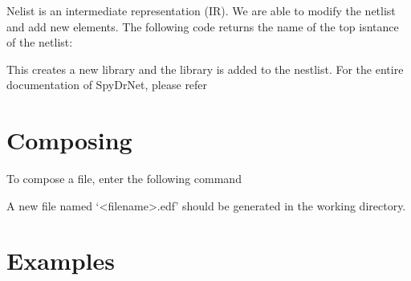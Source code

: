 \documentclass[letterpaper,10pt,english,openany,oneside]{sphinxmanual}
\begin{document}
Nelist is an intermediate representation (IR). We are able to modify the netlist and add new elements. The following code returns the name of the top isntance of the netlist:

\begin{sphinxVerbatim}[commandchars=\\\{\}]
\end{sphinxVerbatim}

This creates a new library and the library is added to the nestlist. For the entire documentation of SpyDrNet, please refer {\hyperref[\detokenize{reference/classes/index:api-summary}]{}}

\begin{sphinxVerbatim}[commandchars=\\\{\}]
\end{sphinxVerbatim}


\section{Composing}
\label{\detokenize{tutorial:composing}}
To compose a file, enter the following command

\begin{sphinxVerbatim}[commandchars=\\\{\}]
 
\end{sphinxVerbatim}

A new file named ‘\textless{}filename\textgreater{}.edf’ should be generated in the working directory.


\section{Examples}
\label{\detokenize{tutorial:examples}}
\end{document}

